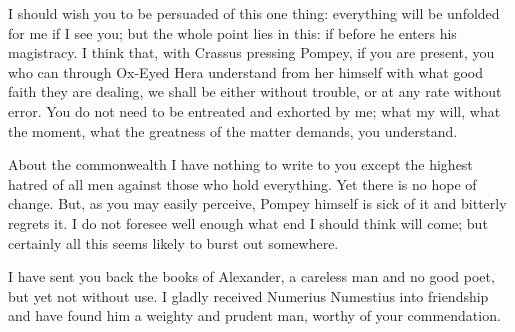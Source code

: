  I should wish you to be persuaded of this one thing: everything will be unfolded for me if I see you; but the whole point lies in this: if before he enters his magistracy. I think that, with Crassus pressing Pompey, if you are present, you who can through Ox-Eyed Hera understand from her himself with what good faith they are dealing, we shall be either without trouble, or at any rate without error. You do not need to be entreated and exhorted by me; what my will, what the moment, what the greatness of the matter demands, you understand.

 About the commonwealth I have nothing to write to you except the highest hatred of all men against those who hold everything. Yet there is no hope of change. But, as you may easily perceive, Pompey himself is sick of it and bitterly regrets it. I do not foresee well enough what end I should think will come; but certainly all this seems likely to burst out somewhere.

 I have sent you back the books of Alexander, a careless man and no good poet, but yet not without use. I gladly received Numerius Numestius into friendship and have found him a weighty and prudent man, worthy of your commendation.
